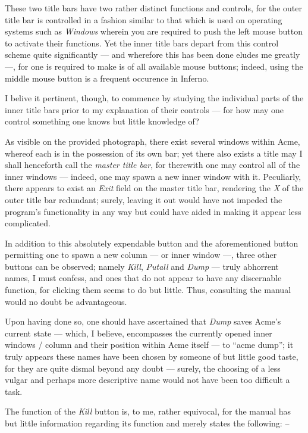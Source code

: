 \documentclass[a5paper,twoside,12pt]{report}
\begin{document}
   These two title bars have two rather distinct functions and controls, for the outer title bar is controlled in a fashion similar to that which is used on operating systems such as \textit{Windows} wherein you are required to push the left mouse button to activate their functions. Yet the inner title bars depart from this control scheme quite significantly — and wherefore this has been done eludes me greatly —, for one is required to make is of all available mouse buttons; indeed, using the middle mouse button is a frequent occurence in Inferno.

   I belive it pertinent, though, to commence by studying the individual parts of the inner title bars prior to my explanation of their controls — for how may one control something one knows but little knowledge of?

  As visible on the provided photograph, there exist several windows within Acme, whereof each is in the possession of its own bar; yet there also exists a title may I shall henceforth call the \textit{master title bar}, for therewith one may control all of the inner windows — indeed, one may spawn a new inner window with it. Peculiarly, there appears to exist an \textit {Exit} field on the master title bar, rendering the \textit{X} of the outer title bar redundant; surely, leaving it out would have not impeded the program's functionality in any way but could have aided in making it appear less complicated.

  In addition to this absolutely expendable button and the aforementioned button permitting one to spawn a new column — or inner window —, three other buttons can be observed; namely \textit{Kill}, \textit{Putall} and \textit{Dump} — truly abhorrent names, I must confess, and ones that do not appear to have any discernable function, for clicking them seems to do but little. Thus, consulting the manual would no doubt be advantageous. 

  Upon having done so, one should have ascertained that \textit{Dump} saves Acme's current state — which, I believe, encompasses the currently opened inner windows / column and their position within Acme itself — to ``acme dump''; it truly appears these names have been chosen by someone of but little good taste, for they are quite dismal beyond any doubt — surely, the choosing of a less vulgar and perhaps more descriptive name would not have been too difficult a task.

  The function of the \textit{Kill} button is, to me, rather equivocal, for the manual has but little information regarding its function and merely states the following: –
\end{document}
